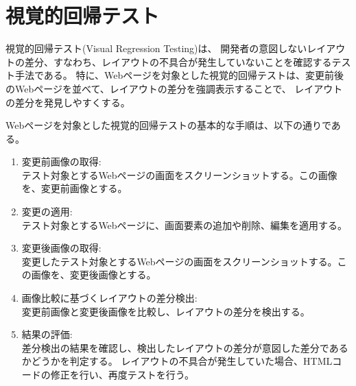 \section{視覚的回帰テスト}\label{sec:vrt}
視覚的回帰テスト(Visual Regression Testing)\cite{VisualRegressionTesting}は、
開発者の意図しないレイアウトの差分、すなわち、レイアウトの不具合が発生していないことを確認するテスト手法である。
特に、Webページを対象とした視覚的回帰テストは、変更前後のWebページを並べて、レイアウトの差分を強調表示することで、
レイアウトの差分を発見しやすくする。
\par
Webページを対象とした視覚的回帰テストの基本的な手順は、以下の通りである。
\begin{enumerate}
      \setlength{\itemsep}{0pt}
            \setlength{\parsep}{0pt}
      \item 変更前画像の取得:\\
            テスト対象とするWebページの画面をスクリーンショットする。この画像を、変更前画像とする。
      \item 変更の適用:\\
            テスト対象とするWebページに、画面要素の追加や削除、編集を適用する。
      \item 変更後画像の取得:\\
            変更したテスト対象とするWebページの画面をスクリーンショットする。この画像を、変更後画像とする。
      \item 画像比較に基づくレイアウトの差分検出:\\
            変更前画像と変更後画像を比較し、レイアウトの差分を検出する。
      \item 結果の評価:\\
            差分検出の結果を確認し、検出したレイアウトの差分が意図した差分であるかどうかを判定する。
            レイアウトの不具合が発生していた場合、HTMLコードの修正を行い、再度テストを行う。
\end{enumerate}

